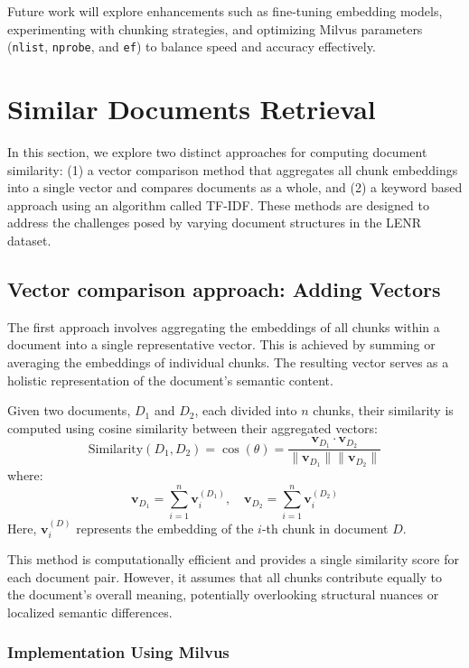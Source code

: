 \documentclass[12pt]{article}
\begin{document}
    Future work will explore enhancements such as fine-tuning embedding models, experimenting with chunking strategies, and optimizing Milvus parameters (\texttt{nlist}, \texttt{nprobe}, and \texttt{ef}) to balance speed and accuracy effectively.
    
\section{Similar Documents Retrieval}

In this section, we explore two distinct approaches for computing document similarity: (1) a vector comparison method that aggregates all chunk embeddings into a single vector and compares documents as a whole, and (2) a keyword based approach using an algorithm called TF-IDF. These methods are designed to address the challenges posed by varying document structures in the LENR dataset.

\subsection{Vector comparison approach: Adding Vectors}

The first approach involves aggregating the embeddings of all chunks within a document into a single representative vector. This is achieved by summing or averaging the embeddings of individual chunks. The resulting vector serves as a holistic representation of the document's semantic content.

Given two documents, \(D_1\) and \(D_2\), each divided into \(n\) chunks, their similarity is computed using cosine similarity between their aggregated vectors:
\[
\text{Similarity}(D_1, D_2) = \cos(\theta) = \frac{\mathbf{v}_{D_1} \cdot \mathbf{v}_{D_2}}{\|\mathbf{v}_{D_1}\| \|\mathbf{v}_{D_2}\|}
\]
where:
\[
\mathbf{v}_{D_1} = \sum_{i=1}^{n} \mathbf{v}_{i}^{(D_1)}, \quad \mathbf{v}_{D_2} = \sum_{i=1}^{n} \mathbf{v}_{i}^{(D_2)}
\]
Here, \(\mathbf{v}_i^{(D)}\) represents the embedding of the \(i\)-th chunk in document \(D\).

This method is computationally efficient and provides a single similarity score for each document pair. However, it assumes that all chunks contribute equally to the document's overall meaning, potentially overlooking structural nuances or localized semantic differences.


\subsubsection{Implementation Using Milvus}
\end{document}
